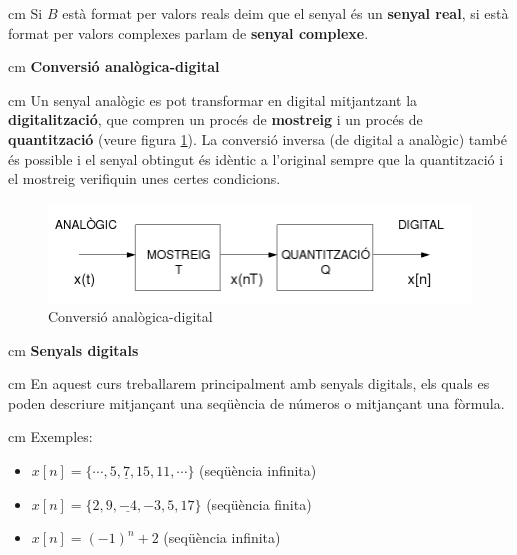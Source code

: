 \documentclass{article}
\begin{document}
 cm
\noindent
Si $B$ est\`a format per valors reals deim que el senyal \'es un \textbf{senyal real},
si est\`a format per valors complexes parlam de \textbf{senyal complexe}.


 cm
\noindent
\textbf{Conversi\'o anal\`ogica-digital}

 cm
\noindent
Un senyal anal\`ogic es pot transformar en digital mitjantzant la
\textbf{digitalitzaci\'o}, que compren un proc\'es de \textbf{mostreig}
i un proc\'es de \textbf{quantitzaci\'o} (veure figura \ref{conversioAD}). 
La conversi\'o inversa (de
digital a anal\`ogic) tamb\'e \'es possible i el senyal obtingut \'es
id\`entic a l'original sempre que la quantitzaci\'o i el mostreig 
verifiquin unes certes condicions.

\begin{figure}[htbp]
\centering
\includegraphics[width=14cm]{conversioAD.png} 
\caption{Conversi\'o anal\`ogica-digital}
\label{conversioAD}
\end{figure}

 cm
\noindent
\textbf{\large Senyals digitals}

 cm
\noindent
En aquest curs treballarem principalment amb senyals digitals, els quals es poden 
descriure mitjan\c{c}ant una seq\"u\`encia de n\'umeros o mitjan\c{c}ant una f\`ormula.

 cm
\noindent
Exemples:
\begin{itemize}
\item $x[n]=\{ \cdots, 5, \underline{7}, 15, 11, \cdots \}$ (seq\"u\`encia infinita)
\item $x[n]=\{2, 9, \underline{-4}, -3, 5, 17 \}$  (seq\"u\`encia finita)
\item $x[n]=(-1)^n + 2$  (seq\"u\`encia infinita)
\end{itemize}
\end{document}
